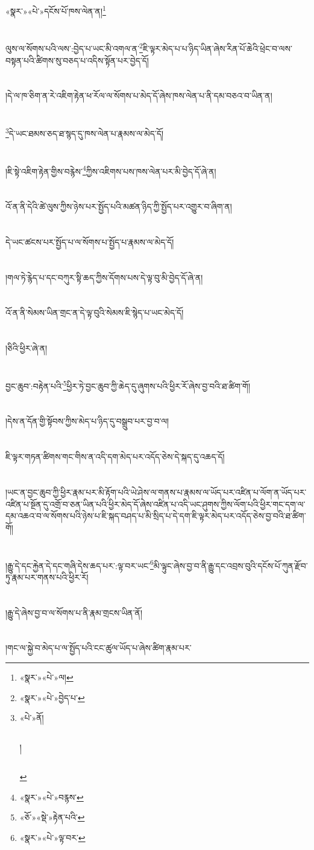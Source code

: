 {«སྣར་»«པེ་»དངོས་པོ་}ཁས་ལེན་ན།\footnote{«སྣར་»«པེ་»ལ།}\chapter{ }ལུས་ལ་སོགས་པའི་ལས་:བྱེད་པ་ཡང་མི་འགལ་ན་\footnote{«སྣར་»«པེ་»བྱེད་པ་}ཇི་ལྟར་མེད་པ་པ་ཉིད་ཡིན་ཞེས་རིན་པོ་ཆེའི་ཕྲེང་བ་ལས་བསྟན་པའི་ཚིགས་སུ་བཅད་པ་འདིས་སྟོན་པར་བྱེད་དོ།\chapter{ }།དེ་ལ་ཁ་ཅིག་ན་རེ་འཇིག་རྟེན་ཕ་རོལ་ལ་སོགས་པ་མེད་དོ་ཞེས་ཁས་ལེན་པ་ནི་དམ་བཅའ་བ་ཡིན་ན།\chapter{ }\footnote{«པེ་»ནོ།\chapter{ }།\chapter{ }}དེ་ཡང་ཐམས་ཅད་ཐ་སྙད་དུ་ཁས་ལེན་པ་རྣམས་ལ་མེད་དོ།\chapter{ }།ཇི་སྟེ་འཇིག་རྟེན་གྱིས་བརྙེས་\footnote{«སྣར་»«པེ་»བརྙས་}ཀྱིས་འཇིགས་པས་ཁས་ལེན་པར་མི་བྱེད་དོ་ཞེ་ན།\chapter{ }འོ་ན་ནི་དེའི་ཚེ་ལུས་ཀྱིས་ཉེས་པར་སྤྱོད་པའི་མཚན་ཉིད་ཀྱི་སྤྱོད་པར་འགྱུར་བ་ཞིག་ན།\chapter{ }དེ་ཡང་ཚངས་པར་སྤྱོད་པ་ལ་སོགས་པ་སྤྱོད་པ་རྣམས་ལ་མེད་དོ།\chapter{ }།གལ་ཏེ་རྙེད་པ་དང་བཀུར་སྟི་ཆད་ཀྱིས་དོགས་པས་དེ་ལྟ་བུ་མི་བྱེད་དོ་ཞེ་ན།\chapter{ }འོ་ན་ནི་སེམས་ཡིན་གྲང་ན་དེ་ལྟ་བུའི་སེམས་ཇི་སྙེད་པ་ཡང་མེད་དོ།\chapter{ }།ཅིའི་ཕྱིར་ཞེ་ན།\chapter{ }བྱང་ཆུབ་:བརྟེན་པའི་\footnote{«ཅོ་»«སྡེ་»རྟེན་པའི་}ཕྱིར་ཏེ་བྱང་ཆུབ་ཀྱི་ཆེད་དུ་ཞུགས་པའི་ཕྱིར་རོ་ཞེས་བྱ་བའི་ཐ་ཚིག་གོ།\chapter{ }།དེས་ན་དོན་གྱི་སྟོབས་ཀྱིས་མེད་པ་ཉིད་དུ་བསྒྲུབ་པར་བྱ་བ་ལ།\chapter{ }ཇི་ལྟར་གཏན་ཚིགས་གང་གིས་ན་འདི་དག་མེད་པར་འདོད་ཅེས་དེ་སྐད་དུ་འཆད་དོ།\chapter{ }།ཡང་ན་བྱང་ཆུབ་ཀྱི་ཕྱིར་རྣམ་པར་མི་རྟོག་པའི་ཡེ་ཤེས་ལ་གནས་པ་རྣམས་ལ་ཡོད་པར་འཛིན་པ་ལོག་ན་ཡོད་པར་འཛིན་པ་སྔོན་དུ་འགྲོ་བ་ཅན་ཡིན་པའི་ཕྱིར་མེད་དོ་ཞེས་འཛིན་པ་འདི་ཡང་ཤུགས་ཀྱིས་ལོག་པའི་ཕྱིར་གང་དག་ལ་དམ་འཆའ་བ་ལ་སོགས་པའི་ཉེས་པ་ཇི་སྐད་བཤད་པ་མི་སྲིད་པ་དེ་དག་ཇི་ལྟར་མེད་པར་འདོད་ཅེས་བྱ་བའི་ཐ་ཚིག་གོ།\chapter{ }།རྒྱུ་དེ་དང་རྐྱེན་དེ་དང་གཞི་དེས་ཆད་པར་:ལྟ་བར་ཡང་\footnote{«སྣར་»«པེ་»ལྟ་བར་}མི་ལྟུང་ཞེས་བྱ་བ་ནི་རྒྱུ་དང་འབྲས་བུའི་དངོས་པོ་ཀུན་རྫོབ་ཏུ་རྣམ་པར་གནས་པའི་ཕྱིར་རོ།\chapter{ }།རྒྱུ་དེ་ཞེས་བྱ་བ་ལ་སོགས་པ་ནི་རྣམ་གྲངས་ཡིན་ནོ།\chapter{ }།གང་ལ་སྐྱེ་བ་མེད་པ་ལ་སྤྱོད་པའི་ངང་ཚུལ་ཡོད་པ་ཞེས་ཚིག་རྣམ་པར་